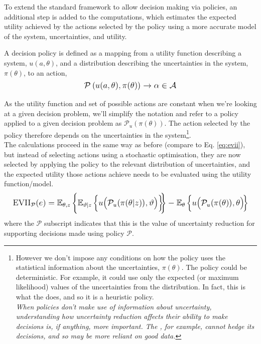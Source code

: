 To extend the standard  framework to allow decision making via policies, an additional step is added to the computations, which estimates the expected utility achieved by the actions selected by the policy using a more accurate model of the system, uncertainties, and utility.

A decision policy is defined as a mapping from a utility function describing a system, $u(a,\theta)$, and a distribution describing the uncertainties in the system, $\pi(\theta)$, to an action,
\begin{equation} \label{eq:policy-defn}
    \mathlarger{\mathcal{P} \left( u(a,\theta),\pi(\theta) \right) \rightarrow \alpha \in \mathcal{A}}
\end{equation}

As the utility function and set of possible actions are constant when we're looking at a given decision problem, we'll simplify the notation and refer to a policy applied to a given decision problem as $\mathcal{P}_u(\pi(\theta))$. The action selected by the policy therefore depends on the uncertainties in the system\footnote{However we don't impose any conditions on how the policy uses the statistical information about the uncertainties, $\pi(\theta)$. The policy could be deterministic. For example, it could use only the expected (or maximum likelihood) values of the uncertainties from the distribution. In fact, this is what the  does, and so it is a heuristic policy.\\[-1.5em]

\noindent \textit{When policies don't make use of information about uncertainty, understanding how uncertainty reduction affects their ability to make decisions is, if anything, more important. The , for example, cannot hedge its decisions, and so may be more reliant on good data.}}.\\

The  calculations proceed in the same way as before (compare to Eq. \ref{eq:evii}), but instead of selecting actions using a stochastic optimisation, they are now selected by applying the policy to the relevant distribution of uncertainties, and the expected utility those actions achieve needs to be evaluated using the utility function/model.
\begin{equation} \label{eq:OP-voi}
    \mathlarger{
        \text{EVII}_{\mathcal{P}}(e) =
        \mathbb{E}_{\theta,z} \left\lbrace \mathbb{E}_{\vartheta|z} \left\lbrace u\!\left( \mathcal{P}_u\!\left(\pi (\theta|z)\right)\!,\vartheta \right) \right\rbrace\!\!\right\rbrace
        - \mathbb{E}_{\theta} \left\lbrace u\!\left(\mathcal{P}_u\!\left(\pi (\theta)\right)\!,\theta \right)\!\right\rbrace
    }
\end{equation}
where the $\mathcal{P}$ subscript indicates that this is the value of uncertainty reduction for supporting decisions made using policy $\mathcal{P}$.\\

